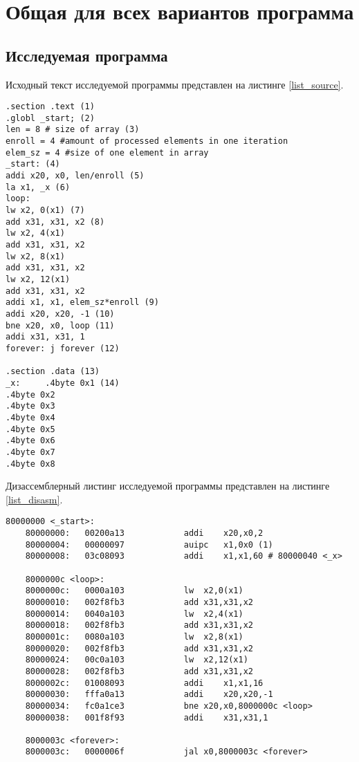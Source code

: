 \chapter*{Общая для всех вариантов программа}

\section*{Исследуемая программа}

Исходный текст исследуемой программы  представлен на листинге \ref{list_source}.

\begin{lstlisting}[caption=Исходный текст общей программы,
	label={list_source}]
.section .text (1)
.globl _start; (2)
len = 8 # size of array (3)
enroll = 4 #amount of processed elements in one iteration
elem_sz = 4 #size of one element in array
_start: (4)
addi x20, x0, len/enroll (5)
la x1, _x (6)
loop:
lw x2, 0(x1) (7)
add x31, x31, x2 (8)
lw x2, 4(x1)
add x31, x31, x2
lw x2, 8(x1)
add x31, x31, x2
lw x2, 12(x1)
add x31, x31, x2
addi x1, x1, elem_sz*enroll (9)
addi x20, x20, -1 (10)
bne x20, x0, loop (11)
addi x31, x31, 1
forever: j forever (12)

.section .data (13)
_x:     .4byte 0x1 (14)
.4byte 0x2
.4byte 0x3
.4byte 0x4
.4byte 0x5
.4byte 0x6
.4byte 0x7
.4byte 0x8
\end{lstlisting}

\clearpage
Дизассемблерный листинг исследуемой программы  представлен на листинге \ref{list_disasm}.


\begin{lstlisting}[caption=Дизассемблерный листинг общей программы,
	label={list_disasm}]
	80000000 <_start>:
	80000000:	00200a13          	addi	x20,x0,2
	80000004:	00000097          	auipc	x1,0x0 (1)
	80000008:	03c08093          	addi	x1,x1,60 # 80000040 <_x>
	
	8000000c <loop>:
	8000000c:	0000a103          	lw	x2,0(x1)
	80000010:	002f8fb3          	add	x31,x31,x2
	80000014:	0040a103          	lw	x2,4(x1)
	80000018:	002f8fb3          	add	x31,x31,x2
	8000001c:	0080a103          	lw	x2,8(x1)
	80000020:	002f8fb3          	add	x31,x31,x2
	80000024:	00c0a103          	lw	x2,12(x1)
	80000028:	002f8fb3          	add	x31,x31,x2
	8000002c:	01008093          	addi	x1,x1,16
	80000030:	fffa0a13          	addi	x20,x20,-1
	80000034:	fc0a1ce3          	bne	x20,x0,8000000c <loop>
	80000038:	001f8f93          	addi	x31,x31,1
	
	8000003c <forever>:
	8000003c:	0000006f          	jal	x0,8000003c <forever>
\end{lstlisting}

